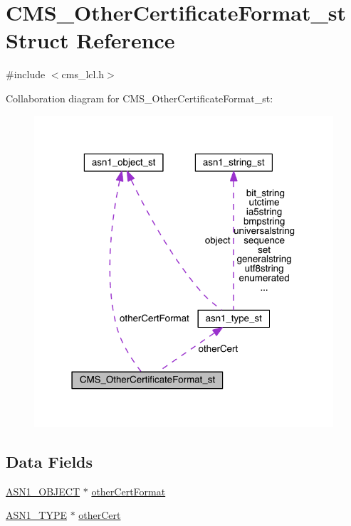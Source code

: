 \hypertarget{struct_c_m_s___other_certificate_format__st}{}\section{C\+M\+S\+\_\+\+Other\+Certificate\+Format\+\_\+st Struct Reference}
\label{struct_c_m_s___other_certificate_format__st}


{\ttfamily \#include $<$cms\+\_\+lcl.\+h$>$}



Collaboration diagram for C\+M\+S\+\_\+\+Other\+Certificate\+Format\+\_\+st\+:\nopagebreak
\begin{figure}[H]
\begin{center}
\leavevmode
\includegraphics[width=315pt]{struct_c_m_s___other_certificate_format__st__coll__graph}
\end{center}
\end{figure}
\subsection*{Data Fields}
\begin{DoxyCompactItemize}
\item 
\hyperlink{crypto_2ossl__typ_8h_ae3fda0801e4c8e250087052bafb3ce2e}{A\+S\+N1\+\_\+\+O\+B\+J\+E\+CT} $\ast$ \hyperlink{struct_c_m_s___other_certificate_format__st_ae67b5d73ea45934be7d0e5053733498b}{other\+Cert\+Format}
\item 
\hyperlink{crypto_2asn1_2asn1_8h_a7895e03d9fee2bc4963faf2a31a9439e}{A\+S\+N1\+\_\+\+T\+Y\+PE} $\ast$ \hyperlink{struct_c_m_s___other_certificate_format__st_a6b54acc480ef7c7acc31bcff86ea4805}{other\+Cert}
\end{DoxyCompactItemize}


